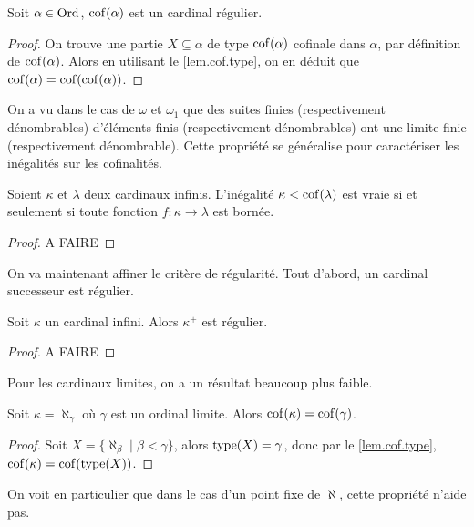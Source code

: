 \begin{property}
  Soit $\alpha\in\operatorname{Ord}$, $\operatorname{cof}(\alpha)$ est un cardinal régulier.
\end{property}

\begin{proof}
  On trouve une partie $X\subseteq\alpha$ de type $\operatorname{cof}(\alpha)$ cofinale dans
  $\alpha$, par définition de $\operatorname{cof}(\alpha)$. Alors en utilisant le
  \cref{lem.cof.type}, on en déduit que $\operatorname{cof}(\alpha) = \operatorname{cof}(\operatorname{cof}(\alpha))$.
\end{proof}

On a vu dans le cas de $\omega$ et $\omega_1$ que des suites finies
(respectivement dénombrables) d'éléments finis (respectivement dénombrables)
ont une limite finie (respectivement dénombrable). Cette propriété se généralise
pour caractériser les inégalités sur les cofinalités.

\begin{proposition}
  Soient $\kappa$ et $\lambda$ deux cardinaux infinis. L'inégalité
  $\kappa < \operatorname{cof}(\lambda)$ est vraie si et seulement si toute fonction
  $f : \kappa \to \lambda$ est bornée.
\end{proposition}

\begin{proof}
  A FAIRE
\end{proof}

On va maintenant affiner le critère de régularité. Tout d'abord, un cardinal
successeur est régulier.

\begin{theorem}
  Soit $\kappa$ un cardinal infini. Alors $\kappa^+$ est régulier.
\end{theorem}

\begin{proof}
  A FAIRE
\end{proof}

Pour les cardinaux limites, on a un résultat beaucoup plus faible.

\begin{proposition}
  Soit $\kappa = \aleph_\gamma$ où $\gamma$ est un ordinal limite. Alors
  $\operatorname{cof}(\kappa) = \operatorname{cof}(\gamma)$.
\end{proposition}

\begin{proof}
  Soit $X = \{\aleph_\beta \mid \beta < \gamma\}$, alors $\operatorname{type}(X) = \gamma$,
  donc par le \cref{lem.cof.type}, $\operatorname{cof}(\kappa) = \operatorname{cof}(\operatorname{type}(X))$.
\end{proof}

On voit en particulier que dans le cas d'un point fixe de $\aleph$, cette
propriété n'aide pas.

